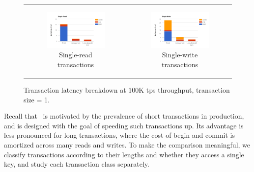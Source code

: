 \begin{figure}[tb]
\centering  
\begin{tabular}{cc}
      \begin{subfigure}[t]{0.5\textwidth}
	\includegraphics[width=.9\textwidth]{figs/stack-brc.png}
    \caption[]{Single-read transactions}
    \label{fig:stack-brc}
  \end{subfigure} &

  \begin{subfigure}[t]{0.5\textwidth}
	\includegraphics[width=.9\textwidth]{figs/stack-bwc.png}
    \caption[]{Single-write transactions}
    \label{fig:stack-bwc}
  \end{subfigure}
  \end{tabular}
\caption{Transaction latency breakdown at 100K tps throughput, transaction size = 1.} 
\label{fig:1key-break}
\end{figure}


Recall that \sys\ is motivated by the prevalence of short transactions in production, and is designed with
the goal of speeding such transactions up.
Its advantage is less pronounced for long transactions, where the cost of begin and commit is amortized
across many reads and writes.
To make the comparison meaningful, we classify transactions according to their lengths and whether they
access a single key, and study each transaction class separately. 

